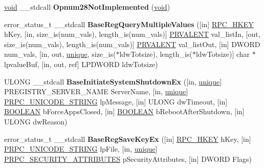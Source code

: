 \begin{DoxyCompactItemize}
\hyperlink{interfacevoid}{void} \+\_\+\+\_\+stdcall {\bfseries Opnum28\+Not\+Implemented} (\hyperlink{interfacevoid}{void})
\item 
\mbox{\label{interfacewinreg_a6f7d622b6767019033e5c7d201e0251e}} 
error\+\_\+status\+\_\+t \+\_\+\+\_\+stdcall {\bfseries Base\+Reg\+Query\+Multiple\+Values} (\mbox{[}in\mbox{]} \hyperlink{interfacevoid}{R\+P\+C\+\_\+\+H\+K\+EY} h\+Key, \mbox{[}in, size\+\_\+is(num\+\_\+vals), length\+\_\+is(num\+\_\+vals)\mbox{]} \hyperlink{structvalue__ent}{P\+R\+V\+A\+L\+E\+NT} val\+\_\+list\+In, \mbox{[}out, size\+\_\+is(num\+\_\+vals), length\+\_\+is(num\+\_\+vals)\mbox{]} \hyperlink{structvalue__ent}{P\+R\+V\+A\+L\+E\+NT} val\+\_\+list\+Out, \mbox{[}in\mbox{]} D\+W\+O\+RD num\+\_\+vals, \mbox{[}in, out, \hyperlink{interfaceunique}{unique}, size\+\_\+is($\ast$ldw\+Totsize), length\+\_\+is($\ast$ldw\+Totsize)\mbox{]} char $\ast$lpvalue\+Buf, \mbox{[}in, out, ref\mbox{]} L\+P\+D\+W\+O\+RD ldw\+Totsize)
\item 
\mbox{\label{interfacewinreg_a90d390b7f6d66303f14e4bd79b09ce8b}} 
U\+L\+O\+NG \+\_\+\+\_\+stdcall {\bfseries Base\+Initiate\+System\+Shutdown\+Ex} (\mbox{[}in, \hyperlink{interfaceunique}{unique}\mbox{]} P\+R\+E\+G\+I\+S\+T\+R\+Y\+\_\+\+S\+E\+R\+V\+E\+R\+\_\+\+N\+A\+ME Server\+Name, \mbox{[}in, \hyperlink{interfaceunique}{unique}\mbox{]} \hyperlink{struct___r_p_c___u_n_i_c_o_d_e___s_t_r_i_n_g}{P\+R\+P\+C\+\_\+\+U\+N\+I\+C\+O\+D\+E\+\_\+\+S\+T\+R\+I\+NG} lp\+Message, \mbox{[}in\mbox{]} U\+L\+O\+NG dw\+Timeout, \mbox{[}in\mbox{]} \hyperlink{_processor_bind_8h_a112e3146cb38b6ee95e64d85842e380a}{B\+O\+O\+L\+E\+AN} b\+Force\+Apps\+Closed, \mbox{[}in\mbox{]} \hyperlink{_processor_bind_8h_a112e3146cb38b6ee95e64d85842e380a}{B\+O\+O\+L\+E\+AN} b\+Reboot\+After\+Shutdown, \mbox{[}in\mbox{]} U\+L\+O\+NG dw\+Reason)
\item 
\mbox{\label{interfacewinreg_a07772ef03fd50b1ffefd212921e7cc4b}} 
error\+\_\+status\+\_\+t \+\_\+\+\_\+stdcall {\bfseries Base\+Reg\+Save\+Key\+Ex} (\mbox{[}in\mbox{]} \hyperlink{interfacevoid}{R\+P\+C\+\_\+\+H\+K\+EY} h\+Key, \mbox{[}in\mbox{]} \hyperlink{struct___r_p_c___u_n_i_c_o_d_e___s_t_r_i_n_g}{P\+R\+P\+C\+\_\+\+U\+N\+I\+C\+O\+D\+E\+\_\+\+S\+T\+R\+I\+NG} lp\+File, \mbox{[}in, \hyperlink{interfaceunique}{unique}\mbox{]} \hyperlink{struct___r_p_c___s_e_c_u_r_i_t_y___a_t_t_r_i_b_u_t_e_s}{P\+R\+P\+C\+\_\+\+S\+E\+C\+U\+R\+I\+T\+Y\+\_\+\+A\+T\+T\+R\+I\+B\+U\+T\+ES} p\+Security\+Attributes, \mbox{[}in\mbox{]} D\+W\+O\+RD Flags)

\end{DoxyCompactItemize}
